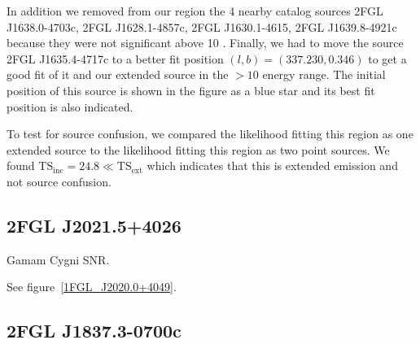 \documentclass[12pt,preprint]{aastex}
\newcommand{\gev}{\text{GeV}\xspace}
\newcommand{\tsext}{{\ensuremath{\text{TS}_\text{ext}}}\xspace}
\newcommand{\tsinc}{\ensuremath{\text{TS}_\text{inc}}\xspace}
\begin{document}
In addition we removed from our region the 4 nearby catalog sources
2FGL J1638.0-4703c, 2FGL J1628.1-4857c, 2FGL  J1630.1-4615, 2FGL
J1639.8-4921c because they were not significant above 10 \gev. Finally,
we had to move the source 2FGL J1635.4-4717c to a better fit position
$(l,b)=(337.230,0.346)$ to get a good fit of it and our extended source in
the $>10$ \gev energy range. The initial position of this source is shown
in the figure as a blue star and its best fit position is also indicated.

To test for source confusion, we compared the likelihood fitting this
region as one extended source to the likelihood fitting this region as
two point sources. We found $\tsinc=24.8\ll\tsext$ which indicates that
this is extended emission and not source confusion.



\subsection{2FGL J2021.5+4026}

Gamam Cygni SNR. 




See figure~\ref{1FGL_J2020.0+4049}.


\subsection{2FGL J1837.3-0700c}


\end{document}
